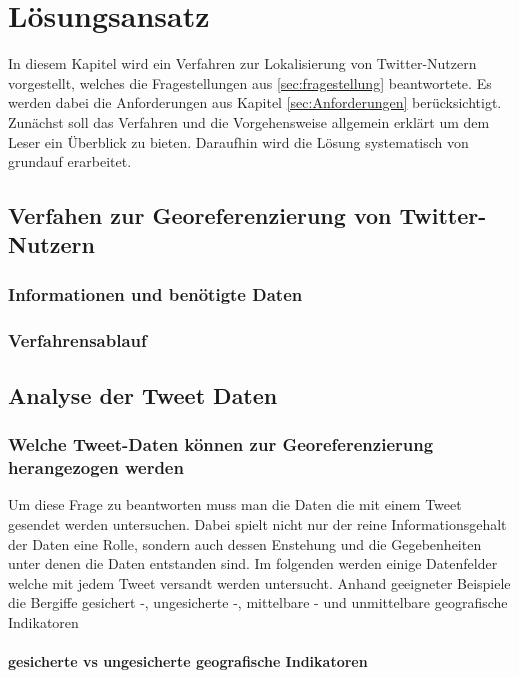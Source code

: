 \chapter{Lösungsansatz} \label{chp:Loesungsansatz}
In diesem Kapitel wird ein Verfahren zur Lokalisierung von Twitter-Nutzern vorgestellt, welches die Fragestellungen aus \ref{sec:fragestellung} beantwortete.
Es werden dabei die Anforderungen aus Kapitel \ref{sec:Anforderungen} berücksichtigt.
Zunächst soll das Verfahren und die Vorgehensweise allgemein erklärt um dem Leser ein Überblick zu bieten. 
Daraufhin wird die Lösung systematisch von grundauf erarbeitet.    

\section{Verfahen zur Georeferenzierung von Twitter-Nutzern}

	\subsection{Informationen und benötigte Daten}

	\subsection{Verfahrensablauf}


\section{Analyse der Tweet Daten}
	
	\subsection{Welche Tweet-Daten können zur Georeferenzierung herangezogen werden}  

	Um diese Frage zu beantworten muss man die Daten die mit einem Tweet gesendet werden untersuchen.  
	Dabei spielt nicht nur der reine Informationsgehalt der Daten eine Rolle, sondern auch dessen Enstehung und die Gegebenheiten unter denen die Daten entstanden sind. 
	Im folgenden werden einige Datenfelder welche mit jedem Tweet versandt werden untersucht.
	Anhand geeigneter Beispiele die Bergiffe gesichert -, ungesicherte -, mittelbare - und unmittelbare geografische Indikatoren 

		\subsubsection{gesicherte vs ungesicherte geografische Indikatoren}

